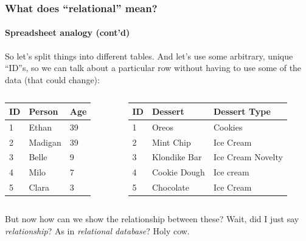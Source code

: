 \documentclass[aspectratio=169]{beamer}
\begin{document}
\begin{frame}
  \frametitle{What does ``relational'' mean?}
  \framesubtitle{Spreadsheet analogy (cont'd)}

  So let's split things into different tables. And let's use some arbitrary,
  unique ``ID''s, so we can talk about a particular row without having to use
  some of the data (that could change):

  \begin{columns}[T]
    \begin{column}{0.3\textwidth}
      \noindent
      \begin{table}[]
        \footnotesize
        \begin{tabular}{@{}lll@{}}
          \toprule
          ID & Person  & Age \\ \midrule
          1  & Ethan   & 39  \\
          2  & Madigan & 39  \\
          3  & Belle   & 9   \\
          4  & Milo    & 7   \\
          5  & Clara   & 3   \\ \bottomrule
        \end{tabular}
      \end{table}
    \end{column}
    \begin{column}{0.5\textwidth}
      \begin{table}[]
        \footnotesize
        \begin{tabular}{@{}lll@{}}
          \toprule
          ID & Dessert      & Dessert Type      \\ \midrule
          1  & Oreos        & Cookies           \\
          2  & Mint Chip    & Ice Cream         \\
          3  & Klondike Bar & Ice Cream Novelty \\
          4  & Cookie Dough & Ice cream         \\
          5  & Chocolate    & Ice Cream         \\ \bottomrule
        \end{tabular}
      \end{table}
    \end{column}
  \end{columns}

  \vspace{1em}

  But now how can we show the relationship between these? Wait, did I just
  say \emph{relationship}? As in \emph{relational database}? Holy cow.
\end{frame}
\end{document}
